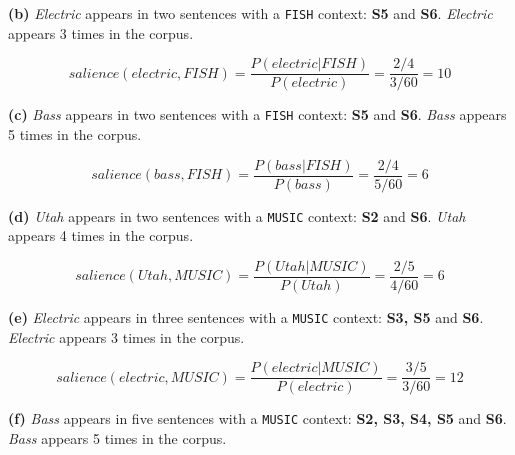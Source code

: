 \documentclass[11pt]{article}
\renewcommand\part[1]{\vspace{.10in}\textbf{(#1)}}
\begin{document}
\part{b} \textit{Electric} appears in two sentences with a {\tt FISH} context: \textbf{S5} and \textbf{S6}. \textit{Electric} appears 3 times in the corpus.

$$salience(electric, FISH) = \frac{P(electric | FISH)}{P(electric)} = \frac{2/4}{3/60} = 10$$


\part{c} \textit{Bass} appears in two sentences with a {\tt FISH} context: \textbf{S5} and \textbf{S6}. \textit{Bass} appears 5 times in the corpus.

$$salience(bass, FISH) = \frac{P(bass | FISH)}{P(bass)} = \frac{2/4}{5/60} = 6$$


\part{d} \textit{Utah} appears in two sentences with a {\tt MUSIC} context: \textbf{S2} and \textbf{S6}. \textit{Utah} appears 4 times in the corpus.

$$salience(Utah, MUSIC) = \frac{P(Utah | MUSIC)}{P(Utah)} = \frac{2/5}{4/60} = 6$$


\part{e} \textit{Electric} appears in three sentences with a {\tt MUSIC} context: \textbf{S3, S5} and \textbf{S6}. \textit{Electric} appears 3 times in the corpus.

$$salience(electric, MUSIC) = \frac{P(electric | MUSIC)}{P(electric)} = \frac{3/5}{3/60} = 12$$


\part{f} \textit{Bass} appears in five sentences with a {\tt MUSIC} context: \textbf{S2, S3, S4, S5} and \textbf{S6}. \textit{Bass} appears 5 times in the corpus.
\end{document}
